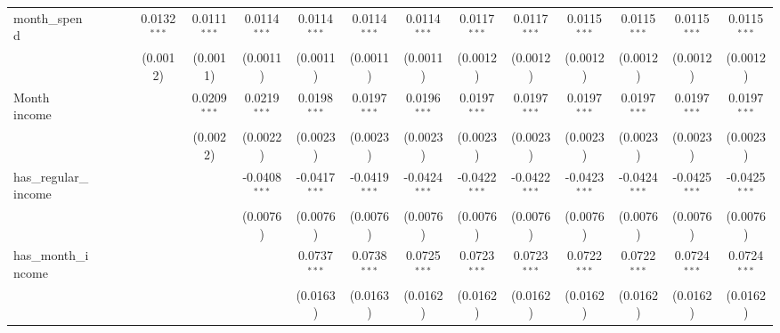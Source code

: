 \begin{table}[htbp]
\begin{tiny}
\begin{tabular}{lccccccccccccccc}
         month\_spend            &                 &                 &                 & 0.0132$^{***}$  & 0.0111$^{***}$  & 0.0114$^{***}$  & 0.0114$^{***}$  & 0.0114$^{***}$  & 0.0114$^{***}$  & 0.0117$^{***}$  & 0.0117$^{***}$  & 0.0115$^{***}$  & 0.0115$^{***}$  & 0.0115$^{***}$  & 0.0115$^{***}$\\
                                  &                 &                 &                 & (0.0012)        & (0.0011)        & (0.0011)        & (0.0011)        & (0.0011)        & (0.0011)        & (0.0012)        & (0.0012)        & (0.0012)        & (0.0012)        & (0.0012)        & (0.0012)\\
         Month income             &                 &                 &                 &                 & 0.0209$^{***}$  & 0.0219$^{***}$  & 0.0198$^{***}$  & 0.0197$^{***}$  & 0.0196$^{***}$  & 0.0197$^{***}$  & 0.0197$^{***}$  & 0.0197$^{***}$  & 0.0197$^{***}$  & 0.0197$^{***}$  & 0.0197$^{***}$\\
                                  &                 &                 &                 &                 & (0.0022)        & (0.0022)        & (0.0023)        & (0.0023)        & (0.0023)        & (0.0023)        & (0.0023)        & (0.0023)        & (0.0023)        & (0.0023)        & (0.0023)\\
         has\_regular\_income   &                 &                 &                 &                 &                 & -0.0408$^{***}$ & -0.0417$^{***}$ & -0.0419$^{***}$ & -0.0424$^{***}$ & -0.0422$^{***}$ & -0.0422$^{***}$ & -0.0423$^{***}$ & -0.0424$^{***}$ & -0.0425$^{***}$ & -0.0425$^{***}$\\
                                  &                 &                 &                 &                 &                 & (0.0076)        & (0.0076)        & (0.0076)        & (0.0076)        & (0.0076)        & (0.0076)        & (0.0076)        & (0.0076)        & (0.0076)        & (0.0076)\\
         has\_month\_income     &                 &                 &                 &                 &                 &                 & 0.0737$^{***}$  & 0.0738$^{***}$  & 0.0725$^{***}$  & 0.0723$^{***}$  & 0.0723$^{***}$  & 0.0722$^{***}$  & 0.0722$^{***}$  & 0.0724$^{***}$  & 0.0724$^{***}$\\
                                  &                 &                 &                 &                 &                 &                 & (0.0163)        & (0.0163)        & (0.0162)        & (0.0162)        & (0.0162)        & (0.0162)        & (0.0162)        & (0.0162)        & (0.0162)\\

\end{tabular}
\end{tiny}
\end{table}
